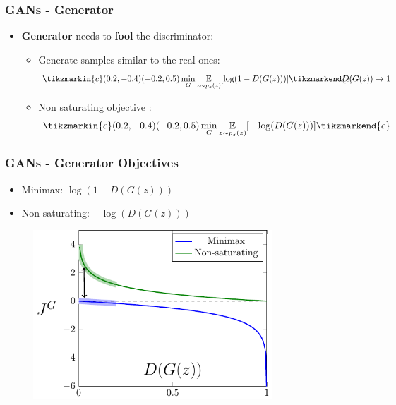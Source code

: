 \documentclass{beamer}
\begin{document}
{
	\begin{frame}[plain]
\end{frame}
}

\begin{frame}
	\frametitle{GANs - Generator}
	\begin{itemize}
		\item \textbf{Generator} needs to \textbf{fool} the discriminator:
		\begin{itemize}	
			\item<1-> \alert<+>{Generate samples similar to the real ones:
			\begin{equation}
				\tikzmarkin{c}(0.2,-0.4)(-0.2,0.5)
				\min_G \underset{z \sim p_z(z)}{\mathbb{E}}[\log(1 - D(G(z)))]
				\tikzmarkend{c}
				\hspace{-1.2cm}
				\tag*{$D(G(z)) \rightarrow 1$}
			\end{equation}}
				\item<2-> \alert<+>{Non saturating objective \citep{goodfellowGenerativeAdversarialNetworks2014}:
					\begin{equation*}
					\tikzmarkin{e}(0.2,-0.4)(-0.2,0.5)
					\min_G  \underset{z \sim p_z(z)}{\mathbb{E}}[ - \log( D(G(z)))]
					\tikzmarkend{e}
				\end{equation*}
				}
		\end{itemize}
	\end{itemize}

\end{frame}

\begin{frame}
\frametitle{GANs - Generator Objectives}
\begin{itemize}
	\item Minimax: $ \log(1 - D(G(z))) $
	\item Non-saturating: $ - \log(D(G(z)))$
\end{itemize}
\begin{figure}
	\includegraphics[width=0.8\textwidth, keepaspectratio]{images/loss_function}
\end{figure}
\end{frame}
\end{document}
